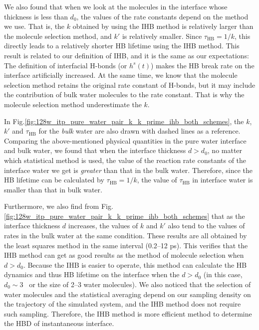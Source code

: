 {We also found that when we look at the molecules in the interface whose thickness is less than $d_0$, 
the values of the rate constants depend on the method we use. 
That is, the $k$ obtained by using the IHB method is relatively larger than the molecule selection method, and $k'$ is relatively smaller. 
Since $\tau_\text{HB} = 1/k$, this directly leads to a relatively shorter HB lifetime using the IHB method. 
This result is related to our definition of IHB, and it is the same as our expectations: The definition of interfacial H-bonds (or $h^s(t)$) makes the HB break rate 
on the interface artificially increased. At the same time, we know that the molecule selection method retains the original rate constant of H-bonds, 
but it may include the contribution of bulk water molecules to the rate constant. That is why the molecule selection method underestimate the $k$. 

In Fig.\thinspace\ref{fig:128w_itp_pure_water_pair_k_k_prime_ihb_both_schemes}, the $k$, $k'$ and $\tau_\text{HB}$ for the \emph{bulk} water 
are also drawn with dashed lines as a reference.
Comparing the above-mentioned physical quantities in the pure water interface and bulk water, we found that when the interface thickness $d>d_0$, 
no matter which statistical method is used, the value of the reaction rate constants of the interface water we get is \emph{greater} than that in the bulk water. 
Therefore, since the HB lifetime can be calculated by $\tau_\text{HB} = 1/k$, the value of $\tau_\text{HB}$ in interface water is smaller than that in bulk water.

Furthermore, we also find from Fig.\thinspace\ref{fig:128w_itp_pure_water_pair_k_k_prime_ihb_both_schemes} that as the interface thickness $d$ increases, 
the values of $k$ and $k'$ also tend to the values of rates in the bulk water at the same condition.
These results are all obtained by the least squares method in the same interval (0.2--12 ps). This verifies that the IHB method 
can get as good results as the method of molecule selection  when $d>d_0$. 
Because the IHB is easier to operate, this method can calculate the HB dynamics and thus HB lifetime on the interface 
when the $d>d_0$ (in this case, $d_0 \sim 3$ \A \ or the size of 2--3 water molecules).
We also noticed that the selection of water molecules and the statistical averaging depend on our sampling density on the trajectory of the simulated system, 
and the IHB method does not require such sampling. Therefore, the IHB method is more efficient method to determine the HBD of instantaneous interface.

}
